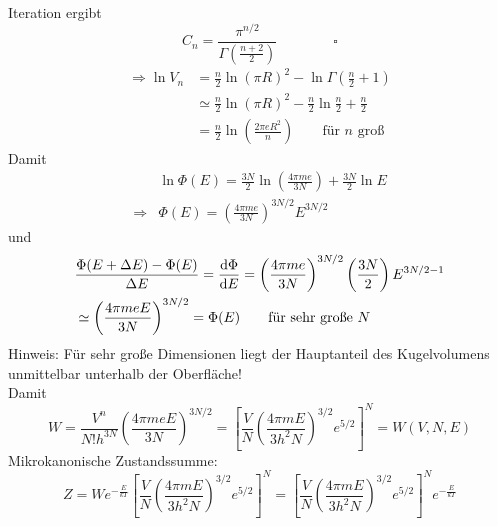 Iteration ergibt
\begin{equation}
    C_n = \frac{\pi^{n/2}}{\Gamma \left( \frac{n+2}{2} \right)} \qquad \qquad \square
\end{equation}
\begin{equation}
    \begin{split}
        \Rightarrow \ln V_n &= \frac{n}{2} \ln \left( \pi R \right)^2 - \ln \Gamma \left( \frac{n}{2} + 1 \right) \\
        &\simeq \frac{n}{2} \ln \left( \pi R \right)^2 - \frac{n}{2} \ln \frac{n}{2} + \frac{n}{2} \\
        &= \frac{n}{2} \ln \left( \frac{2 \pi e R^2}{n} \right) \qquad \text{für $n$ groß}
    \end{split}
\end{equation}
Damit
\begin{equation}
    \begin{split}
        & \ln \Phi(E) = \frac{3 N}{2} \ln \left( \frac{4 \pi m e}{3 N} \right) + \frac{3 N }{2} \ln E \\
        \Rightarrow & \Phi(E) = \left( \frac{4 \pi m e}{3 N} \right)^{3N/2} E^{3 N / 2}
    \end{split}
\end{equation}
und
\begin{equation}
    \begin{split}
        & \frac{\Phi(E + \Delta E) - \Phi(E)}{\Delta E} = \frac{\mathrm{d} \Phi}{\mathrm{d} E} = \left( \frac{4 \pi m e}{3 N} \right)^{3N/2} \left( \frac{3 N}{2} \right) E^{3N/2-1} \\
        & \simeq \left( \frac{4 \pi m e E}{3N} \right)^{3N/2} = \Phi(E) \qquad \text{für sehr große $N$}
    \end{split}
\end{equation}
Hinweis: Für sehr große Dimensionen liegt der Hauptanteil des Kugelvolumens unmittelbar unterhalb der Oberfläche!\\
Damit
\begin{equation}
    W = \frac{V^n}{N! h^{3N}} \left( \frac{4 \pi m e E}{3 N} \right)^{3N/2} = \left[ \frac{V}{N} \left( \frac{4 \pi m E}{3 h^2 N} \right)^{3/2} e^{5/2} \right]^N = W(V, N, E)
\end{equation}
Mikrokanonische Zustandssumme:
\begin{equation}
    Z = W e^{-\frac{E}{k T}} \left[ \frac{V}{N} \left( \frac{4 \pi m E}{3 h^2 N} \right)^{3/2} e^{5/2} \right]^N = \left[ \frac{V}{N} \left( \frac{4 \pi m E}{3 h^2 N} \right)^{3/2} e^{5/2} \right]^N e^{-\frac{E}{k T}}
\end{equation}
